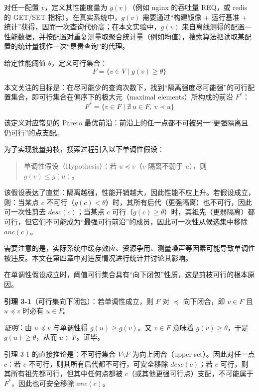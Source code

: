 \documentclass[UTF8,a4paper,12pt,twoside]{ctexart}  %
\begin{document}
对任一配置 \(v\)，定义其性能度量为 \(g(v)\)（例如 nginx 的吞吐量 REQ，或
redis 的 GET/SET 指标）。在真实系统中，\(g(v)\) 需要通过``构建镜像 +
运行基准 + 统计''获得，因而一次查询代价高；在本文实验中，\(g(v)\)
来自离线测得的配置---性能数据，并按配置对重复测量取聚合统计量（例如均值），搜索算法把读取某配置的统计量视作一次``昂贵查询''的代理。

给定性能阈值 \(\theta\)，定义可行集合：
\begin{equation}
  F = \{ v \in V \mid g(v) \ge \theta \}
\end{equation}

本文关注的目标是：在尽可能少的查询次数下，找到``隔离强度尽可能强''的可行配置集合，即可行集合在偏序下的极大元（maximal
elements）所构成的前沿 \(F^*\)：
\begin{equation}
  F^* = \{v\in F\mid \nexists\ u\in F,\ v\prec u\}
\end{equation}

该定义对应常见的 Pareto
最优前沿：前沿上的任一点都不可被另一``更强隔离且仍可行''的点支配。

为了实现批量剪枝，搜索过程引入以下单调性假设：
\begin{quote}
  单调性假设（Hypothesis）：若 \(u \preceq v\)（\(v\) 隔离不弱于
  \(u\)），则 \(g(v) \le g(u)\)。
\end{quote}

该假设表达了直觉：隔离越强，性能开销越大，因此性能不应上升。若假设成立，则：当某点 \(c\)
不可行（\(g(c)<\theta\)）时，其所有后代（更强隔离）也不可行，因此可一次性剪去
\(desc(c)\)；当某点 \(c\)
可行（\(g(c)\ge\theta\)）时，其祖先（更弱隔离）都可行，但它们不可能成为``最强可行前沿''的成员，因此可一次性从候选集中移除
\(anc(c)\)。

需要注意的是，实际系统中缓存效应、资源争用、测量噪声等因素可能导致单调性被违反。本文在第四章中对违反情况进行统计并讨论其影响。

在单调性假设成立时，阈值可行集合具有``向下闭包''性质，这是剪枝可行的根本原因。

\textbf{引理 3-1}（可行集向下闭包）：若单调性成立，则 \(F\) 对
\(\preceq\) 向下闭合，即 \(v\in F\) 且 \(u\preceq v\) 时必有
\(u\in F\)。

\emph{证明}：由 \(u\preceq v\) 与单调性得 \(g(u)\ge g(v)\)。又
\(v\in F\) 意味着 \(g(v)\ge \theta\)，于是 \(g(u)\ge \theta\)，从而
\(u\in F\)。证毕。

引理 3-1 的直接推论是：不可行集合 \(V\setminus F\) 为向上闭合（upper
set）。因此对任一点 \(c\)：若 \(c\) 不可行，则其所有后代都不可行，可安全移除 \(desc(c)\)；若 \(c\)
可行，则其所有祖先都可行，但其中任何点都被
\(c\)（或其他更强可行点）支配，不可能属于 \(F^*\)，因此也可安全移除
\(anc(c)\)。
\end{document}

